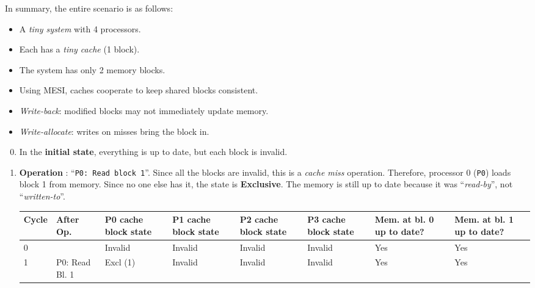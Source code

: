 \newpage

\noindent
In summary, the entire scenario is as follows:
\begin{itemize}
    \item A \emph{tiny system} with 4 processors.
    \item Each has a \emph{tiny cache} (1 block).
    \item The system has only 2 memory blocks.
    \item Using MESI, caches cooperate to keep shared blocks consistent.
    \item \emph{Write-back}: modified blocks may not immediately update memory.
    \item \emph{Write-allocate}: writes on misses bring the block in.
\end{itemize}
\begin{enumerate}
    \setcounter{enumi}{-1}
    \item In the \textbf{initial state}, everything is up to date, but each block is invalid.


    \item \textbf{Operation \theenumi}: ``\texttt{P0: Read block 1}''. Since all the blocks are invalid, this is a \emph{cache miss} operation. Therefore, processor 0 (\texttt{P0}) loads block 1 from memory. Since no one else has it, the state is \textbf{Exclusive}. The memory is still up to date because it was ``\emph{read-by}'', not ``\emph{written-to}''.

    \begin{table}[!htp]
        \centering
        \begin{adjustbox}{width={\textwidth},totalheight={\textheight},keepaspectratio}
            \begin{tabular}{@{} l l p{4em} p{4em} p{4em} p{4em} p{3em} p{3em} @{}}
                \toprule
                \textbf{Cycle} & \textbf{After Op.} & \textbf{P0 cache block state} & \textbf{P1 cache block state} & \textbf{P2 cache block state} & \textbf{P3 cache block state} & \textbf{Mem. at bl. 0 up to date?} & \textbf{Mem. at bl. 1 up to date?} \\
                \midrule
                0   &                   & Invalid   & Invalid   & Invalid   & Invalid   & Yes   & Yes   \\ [.3em]
                1   & P0: Read Bl. 1    & Excl (1)  & Invalid   & Invalid   & Invalid   & Yes   & Yes   \\
                \bottomrule
            \end{tabular}
        \end{adjustbox}
    \end{table}



\end{enumerate}
